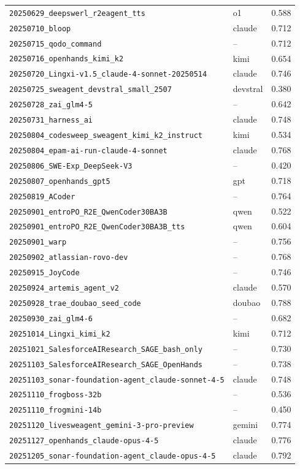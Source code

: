 \documentclass{article}
\begin{document}
\begin{center}
\begin{longtable}{llc}
\texttt{20250629\_deepswerl\_r2eagent\_tts} & o1 & 0.588 \\
\texttt{20250710\_bloop} & claude & 0.712 \\
\texttt{20250715\_qodo\_command} & -- & 0.712 \\
\texttt{20250716\_openhands\_kimi\_k2} & kimi & 0.654 \\
\texttt{20250720\_Lingxi-v1.5\_claude-4-sonnet-20250514} & claude & 0.746 \\
\texttt{20250725\_sweagent\_devstral\_small\_2507} & devstral & 0.380 \\
\texttt{20250728\_zai\_glm4-5} & -- & 0.642 \\
\texttt{20250731\_harness\_ai} & claude & 0.748 \\
\texttt{20250804\_codesweep\_sweagent\_kimi\_k2\_instruct} & kimi & 0.534 \\
\texttt{20250804\_epam-ai-run-claude-4-sonnet} & claude & 0.768 \\
\texttt{20250806\_SWE-Exp\_DeepSeek-V3} & -- & 0.420 \\
\texttt{20250807\_openhands\_gpt5} & gpt & 0.718 \\
\texttt{20250819\_ACoder} & -- & 0.764 \\
\texttt{20250901\_entroPO\_R2E\_QwenCoder30BA3B} & qwen & 0.522 \\
\texttt{20250901\_entroPO\_R2E\_QwenCoder30BA3B\_tts} & qwen & 0.604 \\
\texttt{20250901\_warp} & -- & 0.756 \\
\texttt{20250902\_atlassian-rovo-dev} & -- & 0.768 \\
\texttt{20250915\_JoyCode} & -- & 0.746 \\
\texttt{20250924\_artemis\_agent\_v2} & claude & 0.570 \\
\texttt{20250928\_trae\_doubao\_seed\_code} & doubao & 0.788 \\
\texttt{20250930\_zai\_glm4-6} & -- & 0.682 \\
\texttt{20251014\_Lingxi\_kimi\_k2} & kimi & 0.712 \\
\texttt{20251021\_SalesforceAIResearch\_SAGE\_bash\_only} & -- & 0.730 \\
\texttt{20251103\_SalesforceAIResearch\_SAGE\_OpenHands} & -- & 0.738 \\
\texttt{20251103\_sonar-foundation-agent\_claude-sonnet-4-5} & claude & 0.748 \\
\texttt{20251110\_frogboss-32b} & -- & 0.536 \\
\texttt{20251110\_frogmini-14b} & -- & 0.450 \\
\texttt{20251120\_livesweagent\_gemini-3-pro-preview} & gemini & 0.774 \\
\texttt{20251127\_openhands\_claude-opus-4-5} & claude & 0.776 \\
\texttt{20251205\_sonar-foundation-agent\_claude-opus-4-5} & claude & 0.792 \\
\end{longtable}
\end{center}
\end{document}
